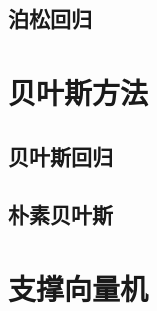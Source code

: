 
\subsection{泊松回归} %
\label{sub:泊松回归}



\section{贝叶斯方法} %
\label{sec:贝叶斯方法}

\subsection{贝叶斯回归} %
\label{sub:贝叶斯回归}


\subsection{朴素贝叶斯} %
\label{sub:朴素贝叶斯}






\section{支撑向量机} %
\label{sec:支撑向量机}



